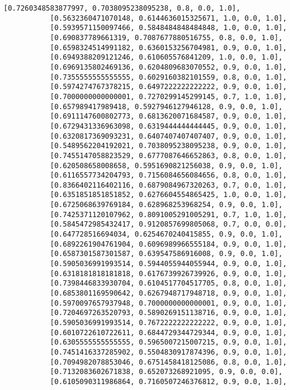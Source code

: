 \documentclass[11pt]{article}
\begin{document}
\begin{Verbatim}[commandchars=\\\{\}]
           [0.7260348583877997, 0.7038095238095238, 0.8, 0.0, 1.0],
           [0.5632360471070148, 0.6144636015325671, 1.0, 0.0, 1.0],
           [0.5939571150097466, 0.5848484848484848, 1.0, 0.0, 1.0],
           [0.690837789661319, 0.7087677880516755, 0.8, 0.0, 1.0],
           [0.6598324514991182, 0.6360153256704981, 0.9, 0.0, 1.0],
           [0.6949388209121246, 0.610605576841209, 1.0, 0.0, 1.0],
           [0.6969135802469136, 0.6204809683070552, 0.9, 0.0, 1.0],
           [0.7355555555555555, 0.6029160382101559, 0.8, 0.0, 1.0],
           [0.5974274767378215, 0.6497222222222222, 0.9, 0.0, 1.0],
           [0.7000000000000001, 0.7270299145299145, 0.7, 1.0, 1.0],
           [0.657989417989418, 0.5927946127946128, 0.9, 0.0, 1.0],
           [0.6911147600802773, 0.6813620071684587, 0.9, 0.0, 1.0],
           [0.6729431336963098, 0.6319444444444445, 0.9, 0.0, 1.0],
           [0.6320817369093231, 0.6407407407407407, 0.9, 0.0, 1.0],
           [0.5489562204192021, 0.7038095238095238, 0.9, 0.0, 1.0],
           [0.7455147058823529, 0.6777087646652863, 0.8, 0.0, 1.0],
           [0.620508658008658, 0.5951690821256038, 0.9, 0.0, 1.0],
           [0.6116557734204793, 0.7156084656084656, 0.8, 0.0, 1.0],
           [0.8366402116402116, 0.6879084967320263, 0.7, 0.0, 1.0],
           [0.6351851851851852, 0.6276604554865425, 1.0, 0.0, 1.0],
           [0.6725068639769184, 0.628968253968254, 0.9, 0.0, 1.0],
           [0.7425371120107962, 0.8091005291005291, 0.7, 1.0, 1.0],
           [0.5845472985432417, 0.9120857699805068, 0.7, 0.0, 0.0],
           [0.647728516694034, 0.6254670240415855, 0.9, 0.0, 1.0],
           [0.6892261904761904, 0.6096989966555184, 0.9, 0.0, 1.0],
           [0.6587301587301587, 0.639547586916008, 0.9, 0.0, 1.0],
           [0.5905036991993514, 0.5944055944055944, 0.9, 0.0, 1.0],
           [0.6318181818181818, 0.6176739926739926, 0.9, 0.0, 1.0],
           [0.7398446833930704, 0.6104517704517705, 0.8, 0.0, 1.0],
           [0.6853801169590642, 0.6267948717948718, 0.9, 0.0, 1.0],
           [0.5970097657937948, 0.7000000000000001, 0.9, 0.0, 1.0],
           [0.7204697263520793, 0.5890269151138716, 0.9, 0.0, 1.0],
           [0.5905036991993514, 0.7672222222222222, 0.9, 0.0, 1.0],
           [0.6010722610722611, 0.6844729344729344, 0.9, 0.0, 1.0],
           [0.6305555555555555, 0.5965007215007215, 0.9, 0.0, 1.0],
           [0.7451416337285902, 0.5504830917874396, 0.9, 0.0, 1.0],
           [0.7094982078853046, 0.6751458418125086, 0.8, 0.0, 1.0],
           [0.7132083602671838, 0.652073268921095, 0.9, 0.0, 0.0],
           [0.6105090311986864, 0.7160507246376812, 0.9, 0.0, 1.0],

\end{Verbatim}
\end{document}
